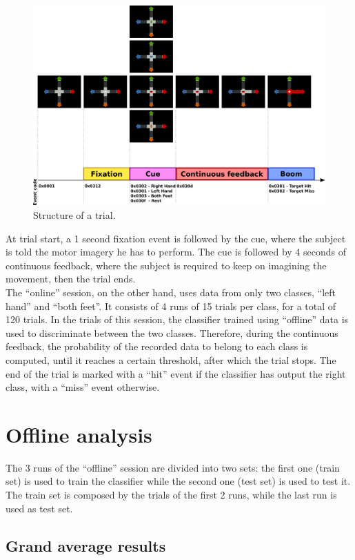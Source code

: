 \begin{figure}[h!]
   \centering
   \includegraphics[width=\textwidth]{images/trial.png}
   \caption{Structure of a trial.}
   \label{fig:trial}
\end{figure}
At trial start, a 1 second fixation event is followed by the cue, where the subject is told the motor imagery he has to perform.
The cue is followed by 4 seconds of continuous feedback, where the subject is required to keep on imagining the movement, then the trial ends. \\
The ``online'' session, on the other hand, uses data from only two classes, ``left hand'' and ``both feet''.
It consists of 4 runs of 15 trials per class, for a total of 120 trials.
In the trials of this session, the classifier trained using ``offline'' data is used to discriminate between the two classes.
Therefore, during the continuous feedback, the probability of the recorded data to belong to each class is computed, until it reaches a certain threshold, after which the trial stops.
The end of the trial is marked with a ``hit'' event if the classifier has output the right class, with a ``miss'' event otherwise.

\section{Offline analysis}
The 3 runs of the ``offline'' session are divided into two sets: the first one (train set) is used to train the classifier while the second one (test set) is used to test it.
The train set is composed by the trials of the first 2 runs, while the last run is used as test set.

\subsection{Grand average results}
